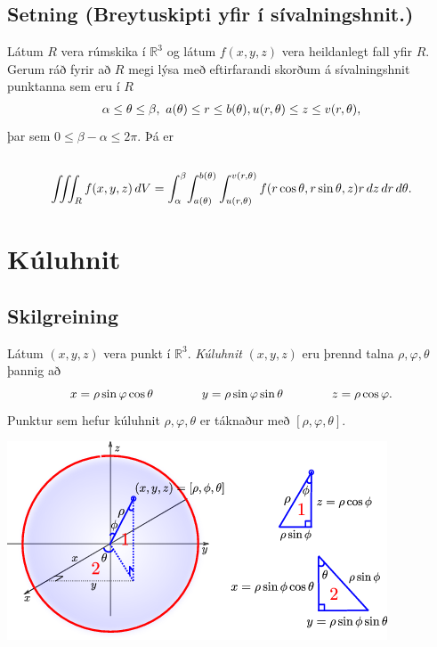 \documentclass[a4paper,10pt,icelandic]{sphinxmanual}
\begin{document}
\subsection{Setning (Breytuskipti yfir í sívalningshnit.)}
\label{Kafli4:index-13}\label{Kafli4:setning-breytuskipti-yfir-i-sivalningshnit}
Látum \(R\) vera rúmskika í \({\mathbb  R}^3\) og látum
\(f(x,y,z)\) vera heildanlegt fall yfir \(R\). Gerum ráð fyrir
að \(R\) megi lýsa með eftirfarandi skorðum á sívalningshnit
punktanna sem eru í \(R\)
\begin{gather}
\begin{split}\displaystyle \alpha\leq \theta\leq \beta,\ a(\theta)\leq r\leq  b(\theta), u(r,\theta)\leq z\leq v(r,\theta),\end{split}\notag
\end{gather}
þar sem \(0\leq \beta-\alpha\leq 2\pi\). Þá er
\begin{gather}
\begin{split}\displaystyle\end{split}\notag\\\begin{split}\int\!\!\!\int\!\!\!\int_R f(x,y,z)\,dV=
\int_\alpha^\beta
\!\int_{a(\theta)}^{b(\theta)}\int_{u(r,\theta)}^{v(r,\theta)}
f(r\cos\theta,r\sin\theta,z)r\,dz\,dr\,d\theta.\end{split}\notag
\end{gather}

\section{Kúluhnit}
\label{Kafli4:index-14}\label{Kafli4:kuluhnit}

\subsection{Skilgreining}
\label{Kafli4:id19}
Látum \((x,y,z)\) vera punkt í \({\mathbb  R}^3\). \textit{Kúluhnit}
\((x,y,z)\) eru þrennd talna \(\rho, \varphi, \theta\) þannig að
\begin{gather}
\begin{split}\displaystyle x=\rho\sin\varphi\cos\theta\qquad\qquad y=\rho\sin\varphi\sin\theta\qquad\qquad z=\rho\cos\varphi.\end{split}\notag
\end{gather}
Punktur sem hefur kúluhnit \(\rho, \varphi, \theta\) er táknaður með
\([\rho, \varphi, \theta]\).

{\hfill\includegraphics[width=0.800\linewidth]{sphere.png}\hfill}
\end{document}
